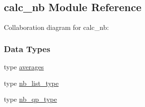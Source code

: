 \hypertarget{classcalc__nb}{\subsection{calc\-\_\-nb Module Reference}
\label{classcalc__nb}
}


Collaboration diagram for calc\-\_\-nb\-:
\subsubsection*{Data Types}
\begin{DoxyCompactItemize}
\item 
type \hyperlink{structcalc__nb_1_1averages}{averages}
\item 
type \hyperlink{structcalc__nb_1_1nb__list__type}{nb\-\_\-list\-\_\-type}
\item 
type \hyperlink{structcalc__nb_1_1nb__qp__type}{nb\-\_\-qp\-\_\-type}
\end{DoxyCompactItemize}
